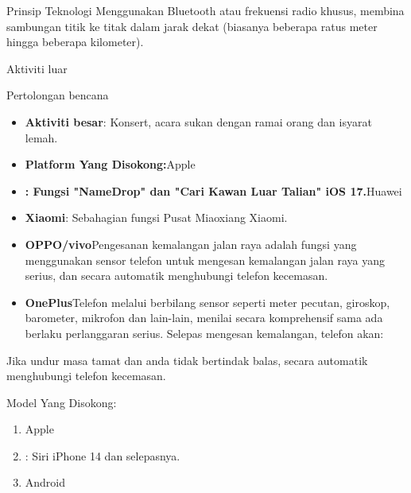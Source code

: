 \begin{tcbinfo}{Prinsip Teknologi}
Menggunakan Bluetooth atau frekuensi radio khusus, membina sambungan titik ke titak dalam jarak dekat (biasanya beberapa ratus meter hingga beberapa kilometer).

\end{tcbinfo}


Aktiviti luar


Pertolongan bencana


\begin{itemize}
  \item \textbf{Aktiviti besar}: Konsert, acara sukan dengan ramai orang dan isyarat lemah.
  \item \textbf{Platform Yang Disokong:}Apple
  \item \textbf{: Fungsi "NameDrop" dan "Cari Kawan Luar Talian" iOS 17.}Huawei
\end{itemize}


\begin{itemize}
  \item \textbf{Xiaomi}: Sebahagian fungsi Pusat Miaoxiang Xiaomi.
  \item \textbf{OPPO/vivo}Pengesanan kemalangan jalan raya adalah fungsi yang menggunakan sensor telefon untuk mengesan kemalangan jalan raya yang serius, dan secara automatik menghubungi telefon kecemasan.
  \item \textbf{OnePlus}Telefon melalui berbilang sensor seperti meter pecutan, giroskop, barometer, mikrofon dan lain-lain, menilai secara komprehensif sama ada berlaku perlanggaran serius. Selepas mengesan kemalangan, telefon akan:
\end{itemize}


Jika undur masa tamat dan anda tidak bertindak balas, secara automatik menghubungi telefon kecemasan.


Model Yang Disokong:

\begin{enumerate}
  \item Apple
  \item : Siri iPhone 14 dan selepasnya.
  \item Android
\end{enumerate}

